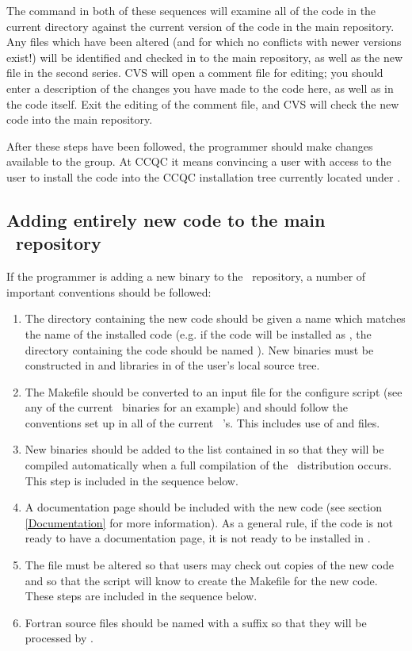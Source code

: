 The  command in both of these sequences will examine all of the code in
the current  directory against the current version of the code in the
main repository. Any files which have been altered (and for which no conflicts
with newer versions exist!) will be identified and checked in to the main
repository, as well as the new file in the second series. CVS will open a
comment file for editing; you should enter a description of the changes you have
made to the code here, as well as in the code itself. Exit the editing of the
comment file, and CVS will check the new code into the main repository.

After these steps have been followed, the programmer should make changes available
to the group. At CCQC it means convincing a user
with access to the  user to install the code
into the CCQC installation tree currently located under
.

\subsection{Adding entirely new code to the main \PSIthree\ repository} \label{checkin_new}
If the programmer is adding a new binary to the \PSIthree\ repository, a number of
important conventions should be followed:
\begin{enumerate}
\item The directory containing the new code should be given a name which
matches the name of the installed code (e.g. if the code will be installed
as , the directory containing the code should be named
). New binaries must be constructed in
 and libraries in
 of the user's local source tree. 
\item The Makefile should be converted to an input file for the configure
script (see any of the current \PSIthree\ binaries for an example) and should
follow the conventions set up in all of the current \PSIthree\ 
's. This
includes use of  and  files.
\item New binaries should be added to the list contained in
 so that they
will be compiled automatically when a full compilation of
the \PSIthree\ distribution occurs. This step is included in the sequence below. 
\item A documentation page should be included with the new code (see
section \ref{Documentation} for more information). As a general rule,
if the code is not ready to have a documentation page, it is not ready
to be installed in \PSIthree. 
\item The  file must be altered so that
users may check out copies of the new code and so that the 
script will know to create the Makefile for the new code. These steps
are included in the sequence below. 
\item Fortran source files should be named with a  suffix so that they
will be processed by \file{psipp}.
\end{enumerate}

